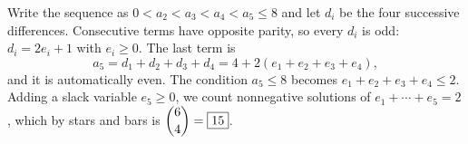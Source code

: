 Write the sequence as $0<a_2<a_3<a_4<a_5\le8$ and let $d_i$ be the four successive differences. Consecutive terms have opposite parity, so every $d_i$ is odd: $d_i=2e_i+1$ with $e_i\ge0$. The last term is
\[a_5=d_1+d_2+d_3+d_4=4+2(e_1+e_2+e_3+e_4),\]
and it is automatically even. The condition $a_5\le8$ becomes $e_1+e_2+e_3+e_4\le2$. Adding a slack variable $e_5\ge0$, we count nonnegative solutions of $e_1+\cdots+e_5=2$, which by stars and bars is $\dbinom{6}{4}=\boxed{15}$.
